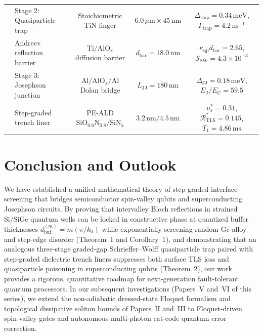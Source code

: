 \documentclass[11pt,letterpaper]{article}
\theoremstyle{definition}
\begin{document}
\begin{table}[t!]
{\begin{tabular}{@{}llccc@{}}
    & Stage 2: Quasiparticle trap & Stoichiometric $\mathrm{TiN}$ finger & $6.0\,\mu\mathrm{m} \times 45\,\mathrm{nm}$ & $\Delta_{\mathrm{trap}} = 0.34\,\mathrm{meV}$, $\Gamma_{\mathrm{trap}} = 4.2\,\mathrm{ns}^{-1}$ \\
    & Andreev reflection barrier & $\mathrm{Ti/AlO_x}$ diffusion barrier & $d_{\mathrm{bar}} = 18.0\,\mathrm{nm}$ & $\kappa_{\mathrm{qp}} d_{\mathrm{bar}} = 2.65$, $\mathcal{S}_{\mathrm{SW}} = 4.3\times 10^{-3}$ \\
    & Stage 3: Josephson junction & $\mathrm{Al/AlO_x/Al}$ Dolan bridge & $L_{\mathrm{JJ}} = 180\,\mathrm{nm}$ & $\Delta_{\mathrm{JJ}} = 0.18\,\mathrm{meV}$, $E_{\mathrm{J}}/E_{\mathrm{C}} = 59.5$ \\
    & Step-graded trench liner & PE-ALD $\mathrm{SiO_{0.6}N_{0.8}} / \mathrm{SiN_x}$ & $3.2\,\mathrm{nm} / 4.5\,\mathrm{nm}$ & $u_\varepsilon^* = 0.31$, $\mathcal{R}_{\mathrm{TLS}}^* = 0.145$, $T_1 = 4.86\,\mathrm{ms}$ \\
    \bottomrule
  \end{tabular}%
  }
\end{table}


\section{Conclusion and Outlook}
\label{sec:conclusion}

We have established a unified mathematical theory of step-graded interface screening that bridges semiconductor spin-valley qubits and superconducting Josephson circuits. By proving that intervalley Bloch reflections in strained $\mathrm{Si/SiGe}$ quantum wells can be locked in constructive phase at quantized buffer thicknesses $d_{\mathrm{buf}}^{(m)} = m(\pi/k_0)$ while exponentially screening random Ge-alloy and step-edge disorder (Theorem~1 and Corollary~1), and demonstrating that an analogous three-stage graded-gap Schrieffer--Wolff quasiparticle trap paired with step-graded dielectric trench liners suppresses both surface TLS loss and quasiparticle poisoning in superconducting qubits (Theorem~2), our work provides a rigorous, quantitative roadmap for next-generation fault-tolerant quantum processors. In our subsequent investigations (Papers~V and~VI of this series), we extend the non-adiabatic dressed-state Floquet formalism and topological dissipative soliton bounds of Papers~II and~III to Floquet-driven spin-valley gates and autonomous multi-photon cat-code quantum error correction.


\appendix
\end{document}
